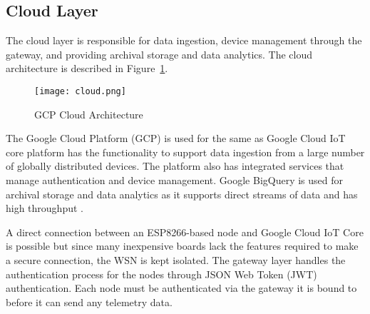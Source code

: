   \FloatBarrier
\subsection{Cloud Layer}
  The cloud layer is responsible for data ingestion, device management through the gateway, and providing archival storage and data analytics. The cloud architecture is described in Figure~\ref{fig:cloud}.


  \begin{figure}[!h]
    \centering
    \texttt{[image: cloud.png]}
    \caption{GCP Cloud Architecture}
    \label{fig:cloud}
  \end{figure}  

  The Google Cloud Platform (GCP) is used for the same as Google Cloud IoT core platform has the functionality to support data ingestion from a large number of globally distributed devices. The platform also has integrated services that manage authentication and device management. Google BigQuery is used for archival storage and data analytics as it supports direct streams of data and has high throughput \cite{iotCore,ref1.13}. 
  
  A direct connection between an ESP8266-based node and Google Cloud IoT Core is possible but since many inexpensive boards lack the features required to make a secure connection, the WSN is kept isolated. The gateway layer handles the authentication process for the nodes through JSON Web Token (JWT) authentication. Each node must be authenticated via the gateway it is bound to before it can send any telemetry data.
